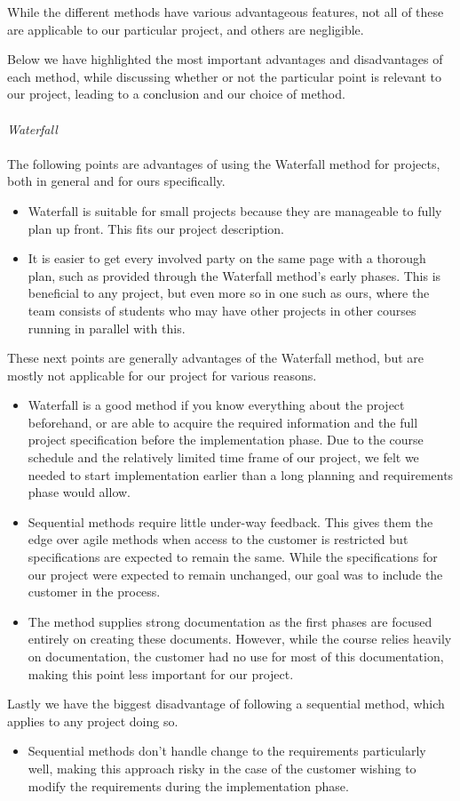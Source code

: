 While the different methods have various advantageous features, not all of these are applicable to our particular project, and others are negligible.

Below we have highlighted the most important advantages and disadvantages of each method, while discussing whether or not the particular point is relevant to our project, leading to a conclusion and our choice of method. \\ \\
\emph{Waterfall} \\ \\
The following points are advantages of using the Waterfall method for projects, both in general and for ours specifically.
	\begin{itemize}
		\item Waterfall is suitable for small projects because they are manageable to fully plan up front. This fits our project description.
		\item It is easier to get every involved party on the same page with a thorough plan, such as provided through the Waterfall method's early phases. This is beneficial to any project, but even more so in one such as ours, where the team consists of students who may have other projects in other courses running in parallel with this.
	\end{itemize}
These next points are generally advantages of the Waterfall method, but are mostly not applicable for our project for various reasons.
	\begin{itemize}
		\item Waterfall is a good method if you know everything about the project beforehand, or are able to acquire the required information and the full project specification before the implementation phase. Due to the course schedule and the relatively limited time frame of our project, we felt we needed to start implementation earlier than a long planning and requirements phase would allow.
		\item Sequential methods require little under-way feedback. This gives them the edge over agile methods when access to the customer is restricted but specifications are expected to remain the same. While the specifications for our project were expected to remain unchanged, our goal was to include the customer in the process.
		\item The method supplies strong documentation as the first phases are focused entirely on creating these documents. However, while the course relies heavily on documentation, the customer had no use for most of this documentation, making this point less important for our project.
	\end{itemize}
Lastly we have the biggest disadvantage of following a sequential method, which applies to any project doing so.
	\begin{itemize}
		\item Sequential methods don't handle change to the requirements particularly well, making this approach risky in the case of the customer wishing to modify the requirements during the implementation phase.
	\end{itemize}

